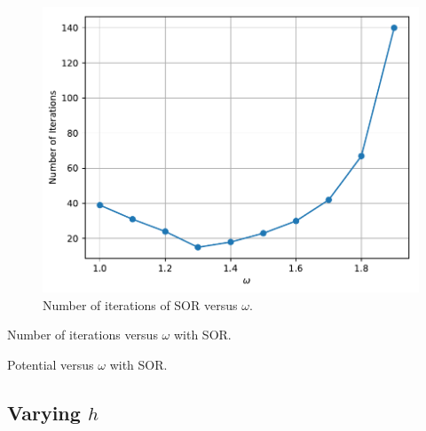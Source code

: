 \documentclass[a4paper,titlepage]{article}
\begin{document}
	\begin{figure}[!htb]
		\centering
		\includegraphics[width=\columnwidth]{plots/q3b.pdf}
		\caption
		{Number of iterations of SOR versus $\omega$.}
		\label{fig:q3b}
	\end{figure}

	\begin{table}[!htb]
		\centering
		\caption{Number of iterations versus $\omega$ with SOR.}
		\label{tabel:q3b_iterations}
	\end{table}

	\begin{table}[!htb]
		\centering
		\caption{Potential versus $\omega$ with SOR.}
		\label{tabel:q3b_potential}
	\end{table}
	
	\subsection{Varying $h$}
	
\end{document}
